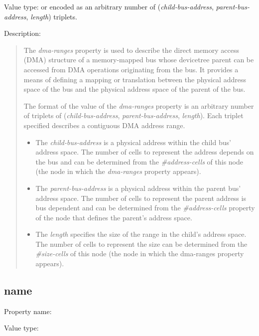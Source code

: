 \documentclass[a4paper,10pt,oneside]{sphinxmanual}
\begin{document}
Value type:  or  encoded as an arbitrary number of
(\emph{child-bus-address}, \emph{parent-bus-address}, \emph{length}) triplets.

Description:
\begin{quote}

The \emph{dma-ranges} property is used to describe the direct memory access
(DMA) structure of a memory-mapped bus whose devicetree parent can be
accessed from DMA operations originating from the bus. It provides a
means of defining a mapping or translation between the physical address
space of the bus and the physical address space of the parent of the
bus.

The format of the value of the \emph{dma-ranges} property is an arbitrary
number of triplets of (\emph{child-bus-address}, \emph{parent-bus-address},
\emph{length}). Each triplet specified describes a contiguous DMA address
range.
\begin{itemize}
\item {} 
The \emph{child-bus-address} is a physical address within the child bus'
address space. The number of cells to represent the address depends
on the bus and can be determined from the \emph{\#address-cells} of this
node (the node in which the \emph{dma-ranges} property appears).

\item {} 
The \emph{parent-bus-address} is a physical address within the parent bus'
address space. The number of cells to represent the parent address is
bus dependent and can be determined from the \emph{\#address-cells}
property of the node that defines the parent’s address space.

\item {} 
The \emph{length} specifies the size of the range in the child’s address
space. The number of cells to represent the size can be determined
from the \emph{\#size-cells} of this node (the node in which the dma-ranges
property appears).

\end{itemize}
\end{quote}


\subsection{name}
\label{devicetree-basics:name}
Property name: 

Value type: 
\end{document}
